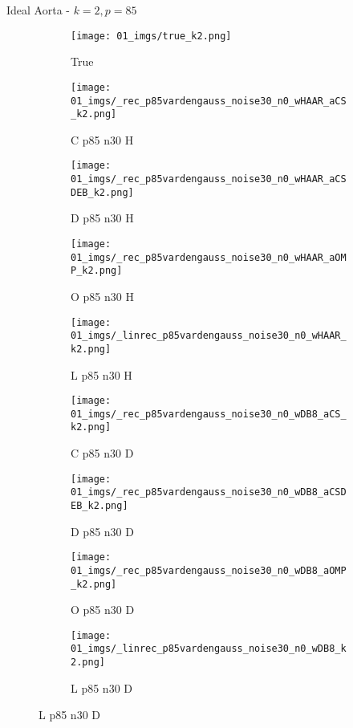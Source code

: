 \begin{frame}{Ideal Aorta - $k=2,p=85$}{}
\begin{figure}
\begin{subfigure}{0.1\textwidth}
\texttt{[image: 01\_imgs/true\_k2.png]}
\caption*{\Tiny True}
\end{subfigure}
\begin{subfigure}{0.1\textwidth}
\texttt{[image: 01\_imgs/\_rec\_p85vardengauss\_noise30\_n0\_wHAAR\_aCS\_k2.png]}
\caption*{\Tiny C p85 n30 H}
\end{subfigure}
\begin{subfigure}{0.1\textwidth}
\texttt{[image: 01\_imgs/\_rec\_p85vardengauss\_noise30\_n0\_wHAAR\_aCSDEB\_k2.png]}
\caption*{\Tiny D p85 n30 H}
\end{subfigure}
\begin{subfigure}{0.1\textwidth}
\texttt{[image: 01\_imgs/\_rec\_p85vardengauss\_noise30\_n0\_wHAAR\_aOMP\_k2.png]}
\caption*{\Tiny O p85 n30 H}
\end{subfigure}
\begin{subfigure}{0.1\textwidth}
\texttt{[image: 01\_imgs/\_linrec\_p85vardengauss\_noise30\_n0\_wHAAR\_k2.png]}
\caption*{\Tiny L p85 n30 H}
\end{subfigure}
\begin{subfigure}{0.1\textwidth}
\texttt{[image: 01\_imgs/\_rec\_p85vardengauss\_noise30\_n0\_wDB8\_aCS\_k2.png]}
\caption*{\Tiny C p85 n30 D}
\end{subfigure}
\begin{subfigure}{0.1\textwidth}
\texttt{[image: 01\_imgs/\_rec\_p85vardengauss\_noise30\_n0\_wDB8\_aCSDEB\_k2.png]}
\caption*{\Tiny D p85 n30 D}
\end{subfigure}
\begin{subfigure}{0.1\textwidth}
\texttt{[image: 01\_imgs/\_rec\_p85vardengauss\_noise30\_n0\_wDB8\_aOMP\_k2.png]}
\caption*{\Tiny O p85 n30 D}
\end{subfigure}
\begin{subfigure}{0.1\textwidth}
\texttt{[image: 01\_imgs/\_linrec\_p85vardengauss\_noise30\_n0\_wDB8\_k2.png]}
\caption*{\Tiny L p85 n30 D}
\end{subfigure}
\end{figure}
\end{frame}

